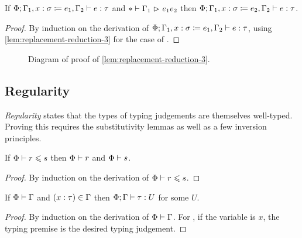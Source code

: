 \begin{lemma} \label{lem:replacement-reduction}
If $\Phi; \Gamma_1, x \mathrel{:} \sigma \mathrel{\coloneqq} e_1, \Gamma_2 \mathrel{\vdash} e \mathrel{:} \tau$
and $* \mathrel{\vdash} \Gamma_1 \mathrel{\rhd}_{} e_1{e_2}$
then $\Phi; \Gamma_1, x \mathrel{:} \sigma \mathrel{\coloneqq} e_2, \Gamma_2 \mathrel{\vdash} e \mathrel{:} \tau$.
\end{lemma}

\begin{proof}
By induction on the derivation of
$\Phi; \Gamma_1, x \mathrel{:} \sigma \mathrel{\coloneqq} e_1, \Gamma_2 \mathrel{\vdash} e \mathrel{:} \tau$,
using \cref{lem:replacement-reduction-3}
for the case of .
\end{proof}

\begin{figure}[h]
\centering
{}
\caption{Diagram of proof of \cref{lem:replacement-reduction-3}.}
\label{fig:replacement-reduction-3}
\end{figure}

\subsection{Regularity}

\emph{Regularity}
states that the types of typing judgements are themselves well-typed.
Proving this requires the substitutivity lemmas as well as a few inversion principles.

\begin{lemma} \label{lem:wf-subsize}
If $\Phi \mathrel{\vdash} r \mathrel{\leqslant} s$ then $\Phi \mathrel{\vdash} r$ and $\Phi \mathrel{\vdash} s$.
\end{lemma}

\begin{proof}
By induction on the derivation of $\Phi \mathrel{\vdash} r \mathrel{\leqslant} s$.
\end{proof}

\begin{lemma} \label{lem:typed-env}
If $\Phi \mathrel{\vdash} \Gamma$ and $(x \mathrel{:} \tau) \in \Gamma$
then $\Phi; \Gamma \mathrel{\vdash} \tau \mathrel{:} U$ for some $U$.
\end{lemma}
\begin{proof}
By induction on the derivation of $\Phi \mathrel{\vdash} \Gamma$.
For , if the variable is $x$, the typing premise is the desired typing judgement.
\end{proof}

